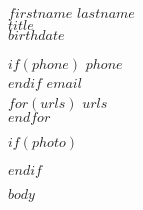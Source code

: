 \documentclass[$fontsize$, a4paper, oneside]{article}
\begin{document}
\begin{minipage}[t]{0.4\linewidth}

{\LARGE $firstname$ $lastname$}\\
\vspace{\baselineskip}
{\Large \MakeLowercase{\textsc{$title$}}}\\
\vspace{\baselineskip}
$birthdate$\\

\end{minipage}
\begin{minipage}[t]{0.4\linewidth}
\vspace{.63cm}

$if(phone)$
\href{tel:$phone$}{$phone$}\\
$endif$
\href{mailto:$email$}{$email$}\\
\vspace{\baselineskip}
$for(urls)$
\href{$urls$}{$urls$}\\
$endfor$

\end{minipage}
$if(photo)$
\begin{minipage}[t]{0.2\linewidth}
\vspace{-1.4cm}
\begin{flushright}
\end{flushright}

\end{minipage}
$endif$

\lipsum[1]

$body$
\end{document}
